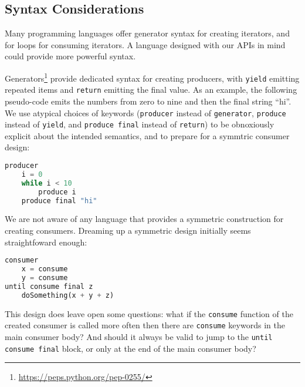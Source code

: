 \documentclass[sigplan,screen,10pt,review]{acmart}
\begin{document}

\subsection{Syntax Considerations}\label{syntax}

Many programming languages offer generator syntax for creating iterators, and for loops for consuming iterators. A language designed with our APIs in mind could provide more powerful syntax.

Generators\footnote{\url{https://peps.python.org/pep-0255/}} provide dedicated syntax for creating producers, with \texttt{yield} emitting repeated items and \texttt{return} emitting the final value. As an example, the following pseudo-code emits the numbers from zero to nine and then the final string ``hi''. We use atypical choices of keywords (\texttt{producer} instead of \texttt{generator}, \texttt{produce} instead of \texttt{yield}, and \texttt{produce final} instead of \texttt{return}) to be obnoxiously explicit about the intended semantics, and to prepare for a symmtric consumer design:

\begin{lstlisting}[language=Python]
producer
    i = 0
    while i < 10
        produce i
    produce final "hi"
\end{lstlisting}

We are not aware of any language that provides a symmetric construction for creating consumers. Dreaming up a symmetric design initially seems straightfoward enough:

\begin{lstlisting}[language=Python]
consumer
    x = consume
    y = consume
until consume final z
    doSomething(x + y + z)
\end{lstlisting}

This design does leave open some questions: what if the \texttt{consume} function of the created consumer is called more often then there are \texttt{consume} keywords in the main consumer body? And should it always be valid to jump to the \texttt{until consume final} block, or only at the end of the main consumer body?
\end{document}

